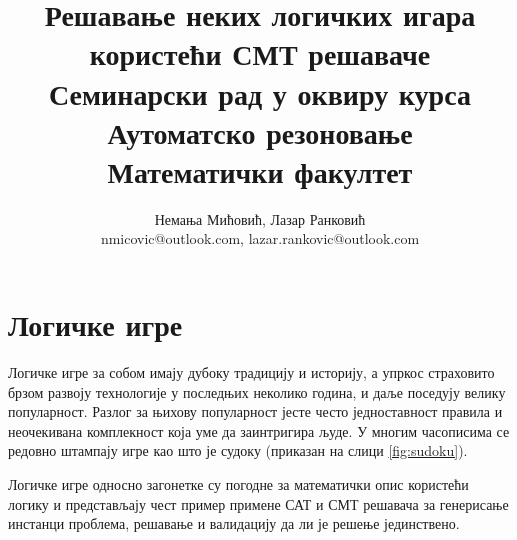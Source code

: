 \documentclass[a4paper]{article}
\begin{document}
\title{Решавање неких логичких игара користећи СМТ решаваче\\ \small{Семинарски рад у оквиру курса\\Аутоматско резоновање\\ Математички факултет}}

\author{Немања Мићовић, Лазар Ранковић\\nmicovic@outlook.com, lazar.rankovic@outlook.com}
\date{}
\maketitle


\tableofcontents

\newpage

\section{Логичке игре}
\label{sec:logicGames}
Логичке игре за собом имају дубоку традицију и историју, а упркос страховито брзом развоју технологије у последњих
неколико година, и даље поседују велику популарност. Разлог за њихову популарност јесте често једноставност правила
и неочекивана комплекност која уме да заинтригира људе. У многим часописима се редовно штампају игре као што је судоку
(приказан на слици \ref{fig:sudoku}).

Логичке игре односно загонетке су погодне за математички опис користећи логику и представљају чест пример примене
САТ и СМТ решавача за генерисање инстанци проблема, решавање и валидацију да ли је решење јединствено.
\end{document}
